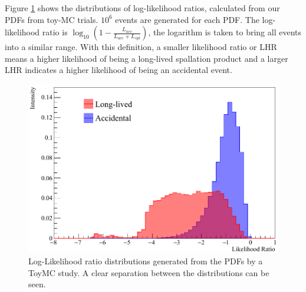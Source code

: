 Figure \ref{fig:LHR} shows the distributions of log-likelihood ratios, calculated from our PDFs from toy-MC trials. $10^6$ events are generated for each PDF. The log-likelihood ratio is $\log_{10}\left(1-\frac{L_{acc}}{L_{acc}+L_{spl}}\right)$, the logarithm is taken to bring all events into a similar range. With this definition, a smaller likelihood ratio or LHR means a higher likelihood of being a long-lived spallation product and a larger LHR indicates a higher likelihood of being an accidental event.
\begin{figure}[htb]
	\centering
	\includegraphics[scale=0.35]{LHR.png}
	\caption{Log-Likelihood ratio distributions generated from the PDFs by a ToyMC study. A clear separation between the distributions can be seen.}
	\label{fig:LHR}
\end{figure}

